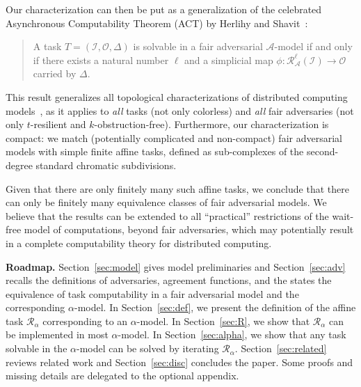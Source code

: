 \documentclass[a4paper]{article}
\newcommand{\myparagraph}[1]{\vspace{6pt}\noindent \textbf{#1}}
\newcommand{\ignore}[1]{}
\def\A{\ensuremath{\mathcal{A}}}
\def\R{\ensuremath{\mathcal{R}}}
\def\I{\ensuremath{\mathcal{I}}}
\def\O{\ensuremath{\mathcal{O}}}
\def\O {\mathcal{O}}
\def\I {\mathcal{I}}
\begin{document}
\ignore{
Symmetric adversaries (or \emph{symmetric progress
  conditions} introduced by Taubenfeld. 
%
A symmetric adversary does not depend on process identifiers: if
$S\in\A$, then for every set of processes $S'$ such that $|S'|=|S|$,
we have $S'\in\A$.
%
Thus, an $n$-process symmetric adversary can be defined
as a set $L$ of ``levels'' in
$\{1,\ldots,n\}$ so that a set of processes is a live set if and only
if its size is in $L$.
%
For example, the \emph{$k$-obstruction free} adversary, recently
characterized in an affine way in~\cite{GHKR16}, consists of all
sets of  sizes from $1$ to $k$.
}

Our characterization can then be put as a generalization of the
celebrated Asynchronous Computability Theorem (ACT) by Herlihy and Shavit~\cite{HS99}:
\begin{quote}
A task $T=(\I,\O,\Delta)$ is solvable in a fair adversarial $\A$-model
if and only if there exists a natural number $\ell$ and a simplicial map
$\phi: \R_{\A}^{\ell}(\I) \rightarrow \O$ carried by $\Delta$.
\end{quote}

This result generalizes all topological characterizations of
distributed computing models~\cite{HS99,GKM14-podc,GHKR16,SHG16},
as it applies to \emph{all} tasks (not only colorless)
and \emph{all} fair adversaries (not only
$t$-resilient and $k$-obstruction-free).
Furthermore, our characterization is compact: we match (potentially complicated and non-compact)
fair adversarial models with simple finite affine tasks, defined as 
sub-complexes of the second-degree standard chromatic subdivisions.

Given that there are only finitely many such affine tasks, we conclude
that there can only be finitely many equivalence classes of fair
adversarial models. We believe that the results can be extended to
all ``practical'' restrictions of the wait-free model of computations, beyond fair
adversaries, which may potentially result in a complete computability
theory for distributed computing.    

\myparagraph{Roadmap.} 
Section~\ref{sec:model} gives model preliminaries and
Section~\ref{sec:adv} recalls the definitions of adversaries,
agreement functions, and the states the equivalence of
task computability in a fair adversarial model and the corresponding
$\alpha$-model.  
In Section~\ref{sec:def}, we present the definition of the affine task
$\R_{\alpha}$ corresponding to an $\alpha$-model.
In Section~\ref{sec:R}, we show that $\R_{\alpha}$ can be implemented
in most $\alpha$-model. 
In Section~\ref{sec:alpha}, we show that any task solvable in 
the $\alpha$-model can be solved by iterating $\R_{\alpha}$.
Section~\ref{sec:related} reviews related work and
Section~\ref{sec:disc} concludes the paper.
%
Some proofs and missing details are delegated to the
optional appendix.
\end{document}
